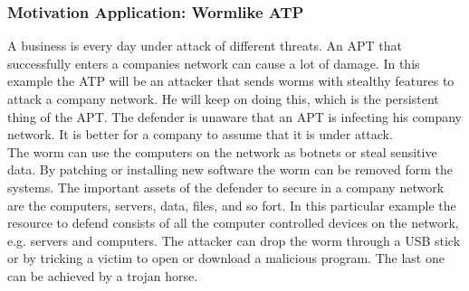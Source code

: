 \subsubsection{Motivation Application: Wormlike ATP}
A business is every day under attack of different threats. An APT that successfully enters a companies network can cause a lot of damage. In this example the ATP will be an attacker that sends worms with stealthy features to attack a company network. He will keep on doing this, which is the persistent thing of the APT. The defender is unaware that an APT is infecting his company network. It is better for a company to assume that it is under attack. \\
The worm can use the computers on the network as botnets or steal sensitive data. By patching or installing new software the worm can be removed form the systems. The important assets of the defender to secure in a company network are the computers, servers, data, files, and so fort. In this particular example the resource to defend consists of all the computer controlled devices on the network, e.g. servers and computers. The attacker can drop the worm through a USB stick or by tricking a victim to open or download a malicious program. The last one can be achieved by a trojan horse. 
